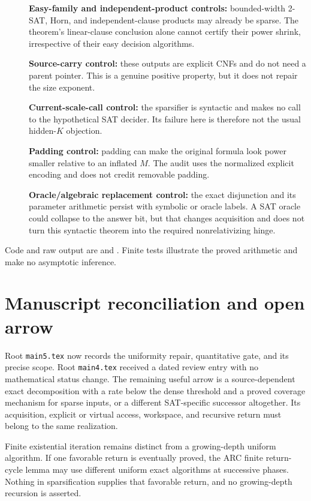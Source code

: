 \documentclass[11pt]{article}
\begin{document}
\begin{description}
\item[] \textbf{Easy-family and independent-product controls:} bounded-width
2-SAT, Horn, and independent-clause products may already be sparse.  The
theorem's linear-clause conclusion alone cannot certify their power shrink,
irrespective of their easy decision algorithms.
\item[] \textbf{Source-carry control:} these outputs are explicit CNFs and do
not need a parent pointer.  This is a genuine positive property, but it does
not repair the size exponent.
\item[] \textbf{Current-scale-call control:} the sparsifier is syntactic and
makes no call to the hypothetical SAT decider.  Its failure here is therefore
not the usual hidden-$K$ objection.
\item[] \textbf{Padding control:} padding can make the original formula look
power smaller relative to an inflated $M$.  The audit uses the normalized
explicit encoding and does not credit removable padding.
\item[] \textbf{Oracle/algebraic replacement control:} the exact disjunction
and its parameter arithmetic persist with symbolic or oracle labels.  A SAT
oracle could collapse to the answer bit, but that changes acquisition and
does not turn this syntactic theorem into the required nonrelativizing hinge.
\end{description}

Code and raw output are
 and
.
Finite tests illustrate the proved arithmetic and make no asymptotic inference.

\section{Manuscript reconciliation and open arrow}
Root \texttt{main5.tex} now records the uniformity repair, quantitative gate,
and its precise scope.  Root \texttt{main4.tex} received a dated review entry
with no mathematical status change.  The remaining useful arrow is a
source-dependent exact decomposition with a rate below the dense threshold
and a proved coverage mechanism for sparse inputs, or a different SAT-specific
successor altogether.  Its acquisition, explicit or virtual access, workspace,
and recursive return must belong to the same realization.

Finite existential iteration remains distinct from a growing-depth uniform
algorithm.  If one favorable return is eventually proved, the ARC finite
return-cycle lemma may use different uniform exact algorithms at successive
phases.  Nothing in sparsification supplies that favorable return, and no
growing-depth recursion is asserted.
\end{document}
